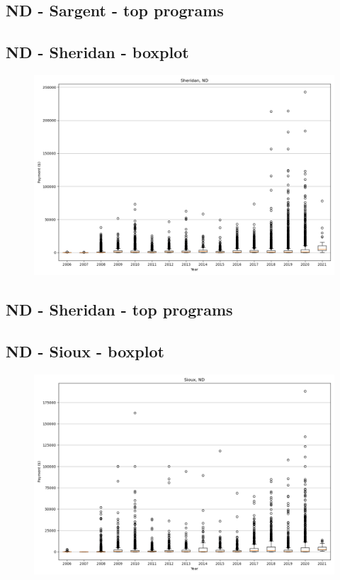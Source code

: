 \subsection*{ND - Sargent - top programs}

\newpage
\subsection*{ND - Sheridan - boxplot}
\begin{figure}[h]
\centering
\includegraphics[width=7in]{../output/boxplots/counties/Sheridan-ND_boxplot.png}
\end{figure}


\subsection*{ND - Sheridan - top programs}

\newpage
\subsection*{ND - Sioux - boxplot}
\begin{figure}[h]
\centering
\includegraphics[width=7in]{../output/boxplots/counties/Sioux-ND_boxplot.png}
\end{figure}


